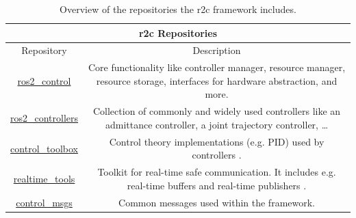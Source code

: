 \begin{table}[htbp]
    \centering
\begin{tabular}{ |c|c| }
\hline
\multicolumn{2}{|c|}{\gls{r2c} Repositories} \\
\hline
Repository & Description  \\
\hline
\hline
\href{https://github.com/ros-controls/ros2_control}{ros2\_control} 
 & \begin{minipage}{11cm}
	 \vspace{8pt}
		 Core functionality like controller manager, resource manager, resource storage,  interfaces for hardware abstraction, and more.
	 \vspace{8pt}
	\end{minipage}  \\\hline
\href{https://github.com/ros-controls/ros2_controllers}{ros2\_controllers}  & \begin{minipage}{11cm}
	 \vspace{8pt}
		 Collection of commonly and widely used controllers like an admittance controller, a joint trajectory controller, \dots
	 \vspace{8pt}
	\end{minipage}  \\\hline
\href{https://github.com/ros-controls/control_toolbox}{control\_toolbox}  & \begin{minipage}{11cm}
	 \vspace{8pt}
		Control theory implementations (e.g. PID) used by controllers 
  \cite{chitta_ros_control_2017}.
	 \vspace{8pt}
	\end{minipage}  \\\hline
\href{https://github.com/ros-controls/realtime_tools}{realtime\_tools}  & \begin{minipage}{11cm}
	 \vspace{8pt}
		 Toolkit for real-time safe communication. It includes e.g. real-time buffers and real-time publishers \cite{chitta_ros_control_2017}.
	 \vspace{8pt}
	\end{minipage}  \\\hline
\href{https://github.com/ros-controls/control_msgs}{control\_msgs}   & \begin{minipage}{11cm}
	 \vspace{8pt}
		 Common messages used within the framework.
	 \vspace{8pt}
	\end{minipage}  \\
\hline
\end{tabular}
    \caption{Overview of the repositories the \gls{r2c} framework includes.}
    \label{c3_tab_r2c_repos}
\end{table}
